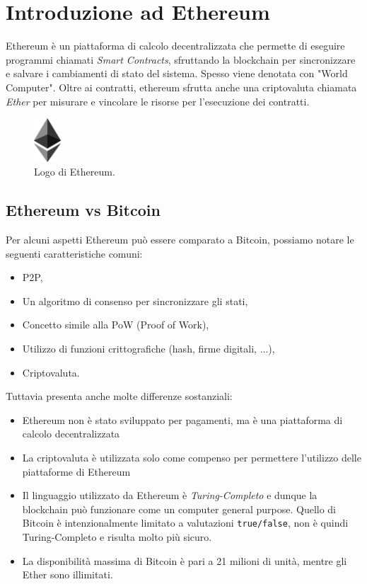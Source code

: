 \chapter{Introduzione ad Ethereum}
Ethereum è un piattaforma di calcolo decentralizzata che permette di eseguire programmi
chiamati \textit{Smart Contracts},
sfruttando la blockchain per sincronizzare e salvare i cambiamenti di stato del sistema.
Spesso viene denotata con "World Computer".
Oltre ai contratti, ethereum sfrutta anche una criptovaluta chiamata \textit{Ether} per
misurare e vincolare le risorse per l'esecuzione dei contratti.


\begin{figure}[H]
      \centering
      \includegraphics[width=1cm, keepaspectratio]{capitoli/ethereum/imgs/ethereum.png}
      \caption{Logo di Ethereum.}
\end{figure}

\section{Ethereum vs Bitcoin}
Per alcuni aspetti Ethereum può essere comparato a Bitcoin,
possiamo notare le seguenti caratteristiche comuni:

\begin{itemize}
      \item P2P,
      \item Un algoritmo di consenso per sincronizzare gli stati,
      \item Concetto simile alla PoW (Proof of Work),
      \item Utilizzo di funzioni crittografiche (hash, firme digitali, ...),
      \item Criptovaluta.
\end{itemize}

Tuttavia presenta anche molte differenze sostanziali:

\begin{itemize}
      \item Ethereum non è stato sviluppato per pagamenti, ma è una piattaforma di calcolo
            decentralizzata
      \item La criptovaluta è utilizzata solo come compenso per permettere
            l'utilizzo delle piattaforme di Ethereum
      \item Il linguaggio utilizzato da Ethereum è \textit{Turing-Completo} e dunque
            la blockchain può funzionare come un computer general purpose.
            Quello di Bitcoin è intenzionalmente limitato a valutazioni \verb|true/false|,
            non è quindi Turing-Completo e risulta molto più sicuro.
      \item La disponibilità massima di Bitcoin è pari a 21 milioni di unità, mentre gli
            Ether sono illimitati.
\end{itemize}

